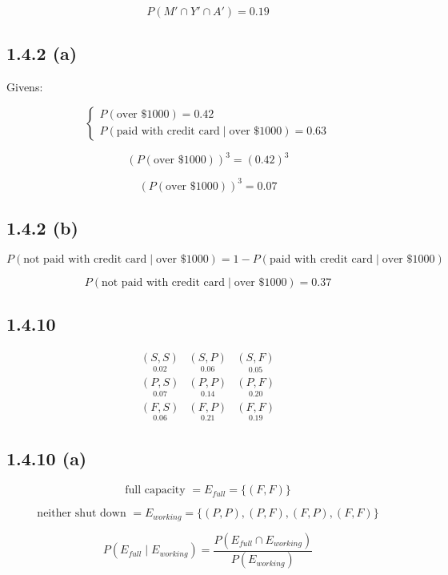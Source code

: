 \documentclass{article}
\begin{document}
\[
\boxed{P(M'\cap Y'\cap A') = 0.19}
\]

\subsection*{1.4.2 (a)}

Givens:

\[
\begin{cases}
P(\text{over \$1000}) = 0.42 \\
P\left(\text{paid with credit card}\mid\text{over \$1000}\right) = 0.63
\end{cases}
\]

\[
(P(\text{over \$1000}))^3 = (0.42)^3
\]

\[
\boxed{(P(\text{over \$1000}))^3 = 0.07}
\]

\subsection*{1.4.2 (b)}

\[
P\left(\text{not paid with credit card}\mid\text{over \$1000}\right) =
1 - P\left(\text{paid with credit card}\mid\text{over \$1000}\right)
\]

\[
\boxed{P\left(\text{not paid with credit card}\mid\text{over \$1000}\right) = 0.37}
\]

\subsection*{1.4.10}

\[
\begin{array}{ccc}
\underset{0.02}{(S, S)} & \underset{0.06}{(S, P)} & \underset{0.05}{(S, F)} \\
\underset{0.07}{(P, S)} & \underset{0.14}{(P, P)} & \underset{0.20}{(P, F)} \\
\underset{0.06}{(F, S)} & \underset{0.21}{(F, P)} & \underset{0.19}{(F, F)}
\end{array}
\]

\subsection*{1.4.10 (a)}

\[
\text{full capacity } = E_{full} = \{(F, F)\}
\]

\[
\text{neither shut down } = E_{working} = \{(P, P), (P, F), (F, P), (F, F)\}
\]

\[
P\left(E_{full}\mid E_{working}\right) =
\frac{P(E_{full}\cap E_{working})}{P(E_{working})}
\]
\end{document}
